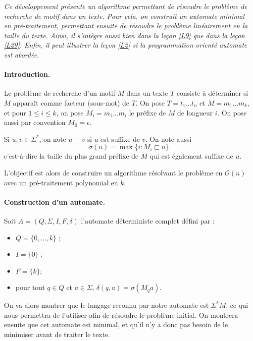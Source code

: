 
\textit{Ce développement présente un algorithme permettant de résoudre le problème de recherche de motif dans un texte. Pour cela, on construit un automate minimal en pré-traitement, permettant ensuite de résoudre le problème linéairement en la taille du texte. Ainsi, il s'intègre aussi bien dans la leçon \ref{L9} que dans la leçon \ref{L29}. Enfin, il peut illustrer la leçon \ref{L2} si la programmation orienté automate est abordée.}


\paragraph{Introduction.}

Le problème de recherche d'un motif $M$ dans un texte $T$ consiste à déterminer si $M$ apparaît comme facteur (sous-mot) de $T$. On pose $T=t_1...t_n$ et $M=m_1...m_k$, et pour $1\leq i \leq k$, on pose $M_i=m_1...m_i$ le préfixe de $M$ de longueur $i$. On pose aussi par convention $M_0= \epsilon$.\newline

Si $u,v\in \Sigma^*$, on note $u \sqsubset v$ si $u$ est suffixe de $v$. On note aussi 
$$
\sigma(u) = \max\{ i : M_i \sqsubset u\}
$$
c'est-à-dire la taille du plus grand préfixe de $M$ qui est également suffixe de $u$. 


L'objectif est alors de construire un algorithme résolvant le problème en $\mathcal{O}(n)$ avec un pré-traitement polynomial en $k$.


\paragraph{Construction d'un automate.} Soit $A=(Q,\Sigma, I,F,\delta)$ l'automate déterministe complet défini par :
\begin{itemize}
\item $Q=\{0,...,k\}$ ;
\item $I=\{0\}$ ;
\item $F=\{k\}$;
\item pour tout $q\in Q$ et $a\in \Sigma$, $\delta(q,a) = \sigma(M_qa)$.
\end{itemize}

On va alors montrer que le langage reconnu par notre automate est $\Sigma^*M$, ce qui nous permettra de l'utiliser afin de résoudre le problème initial. On montrera ensuite que cet automate est minimal, et qu'il n'y a donc pas besoin de le minimiser avant de traiter le texte.

